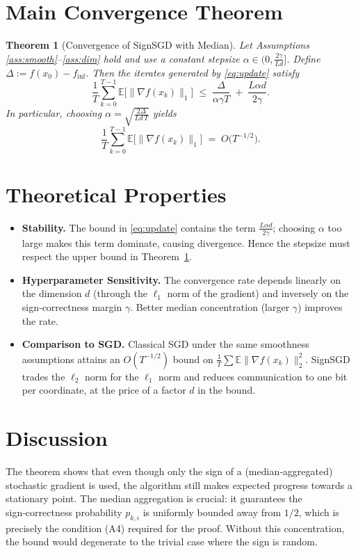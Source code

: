 \documentclass{article}
\newtheorem{theorem}{Theorem}
\newcommand{\E}{\mathbb{E}}
\begin{document}
\section*{Main Convergence Theorem}
\begin{theorem}[Convergence of SignSGD with Median]
\label{thm:main}
Let Assumptions \ref{ass:smooth}–\ref{ass:dim} hold and use a constant stepsize
$\alpha\in\bigl(0,\frac{2\gamma}{L d}\bigr]$.
Define $\Delta:=f(x_0)-f_{\inf}$.
Then the iterates generated by \eqref{eq:update} satisfy
\[
\frac{1}{T}\sum_{k=0}^{T-1}\E\!\bigl[\|\nabla f(x_k)\|_1\bigr]
\;\le\;
\frac{\Delta}{\alpha\gamma T}
\;+\;
\frac{L\alpha d}{2\gamma}.
\tag{1}
\]
In particular, choosing $\alpha=\sqrt{\frac{2\Delta}{L d\,T}}$ yields
\[
\frac{1}{T}\sum_{k=0}^{T-1}\E\!\bigl[\|\nabla f(x_k)\|_1\bigr]
\;=\;
O\!\bigl(T^{-1/2}\bigr).
\]
\end{theorem}

\section*{Theoretical Properties}
\begin{itemize}
\item \textbf{Stability.} The bound in \eqref{eq:update} contains the term
$\frac{L\alpha d}{2\gamma}$; choosing $\alpha$ too large makes this term dominate,
causing divergence. Hence the stepsize must respect the upper bound in Theorem~\ref{thm:main}.
\item \textbf{Hyperparameter Sensitivity.} The convergence rate depends linearly on
the dimension $d$ (through the $\ell_1$ norm of the gradient) and inversely on the
sign‑correctness margin $\gamma$. Better median concentration (larger $\gamma$)
improves the rate.
\item \textbf{Comparison to SGD.} Classical SGD under the same smoothness
assumptions attains an $O(T^{-1/2})$ bound on $\frac{1}{T}\sum\E\|\nabla f(x_k)\|_2^{2}$.
SignSGD trades the $\ell_2$ norm for the $\ell_1$ norm and reduces communication
to one bit per coordinate, at the price of a factor $d$ in the bound.
\end{itemize}

\section*{Discussion}
The theorem shows that even though only the sign of a (median‑aggregated) stochastic
gradient is used, the algorithm still makes expected progress towards a stationary
point. The median aggregation is crucial: it guarantees the sign‑correctness
probability $p_{k,i}$ is uniformly bounded away from $1/2$, which is precisely the
condition (A4) required for the proof. Without this concentration, the bound would
degenerate to the trivial case where the sign is random.
\end{document}
